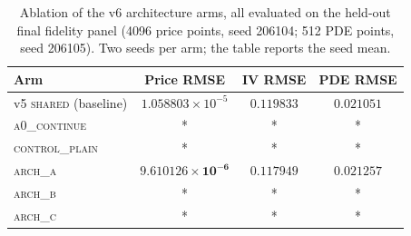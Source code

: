 \begin{table}[t]
\centering
\caption{Ablation of the v6 architecture arms, all evaluated on the held-out
final fidelity panel (4096 price points, seed 206104; 512 PDE points, seed
206105). Two seeds per arm; the table reports the seed mean.}
\label{tab:ablation}
\begin{tabular}{lccc}
\toprule
Arm & Price RMSE & IV RMSE & PDE RMSE \\
\midrule
v5 \textsc{shared} (baseline)   & $1.058803\times10^{-5}$ & $0.119833$ & $0.021051$ \\
\textsc{a0\_continue}           & *                       & *          & *          \\
\textsc{control\_plain}         & *                       & *          & *          \\
\textsc{arch\_a}                & $\mathbf{9.610126\times10^{-6}}$ & $\mathbf{0.117949}$ & $0.021257$ \\
\textsc{arch\_b}                & *                       & *          & *          \\
\textsc{arch\_c}                & *                       & *          & *          \\
\bottomrule
\end{tabular}
\end{table}
